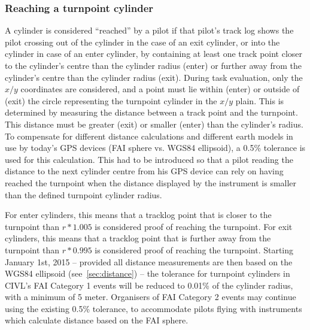 \documentclass{article}
\begin{document}
\subsubsection{Reaching a turnpoint cylinder}
A cylinder is considered “reached” by a pilot if that pilot’s track log shows the pilot crossing out of the
cylinder in the case of an exit cylinder, or into the cylinder in case of an enter cylinder, by containing at
least one track point closer to the cylinder’s centre than the cylinder radius (enter) or further away from
the cylinder’s centre than the cylinder radius (exit). During task evaluation, only the \(x/y\) coordinates are
considered, and a point must lie within (enter) or outside of (exit) the circle representing the turnpoint
cylinder in the \(x/y\) plain. This is determined by measuring the distance between a track point and the
turnpoint. This distance must be greater (exit) or smaller (enter) than the cylinder’s radius.
To compensate for different distance calculations and different earth models in use by today’s GPS
devices (FAI sphere vs. WGS84 ellipsoid), a 0.5\% tolerance is used for this calculation. This had to be
introduced so that a pilot reading the distance to the next cylinder centre from his GPS device can rely
on having reached the turnpoint when the distance displayed by the instrument is smaller than the
defined turnpoint cylinder radius.

For enter cylinders, this means that a tracklog point that is closer to the turnpoint than \(r*1.005\) is
considered proof of reaching the turnpoint. For exit cylinders, this means that a tracklog point that is
further away from the turnpoint than \(r*0.995\) is considered proof of reaching the turnpoint.
Starting January 1st, 2015 – provided all distance measurements are then based on the WGS84 ellipsoid
(see~\ref{sec:distance}) – the tolerance for turnpoint cylinders in CIVL’s FAI Category 1 events will be reduced to 0.01\%
of the cylinder radius, with a minimum of 5 meter. Organisers of FAI Category 2 events may continue
using the existing 0.5\% tolerance, to accommodate pilots flying with instruments which calculate
distance based on the FAI sphere.
\end{document}
